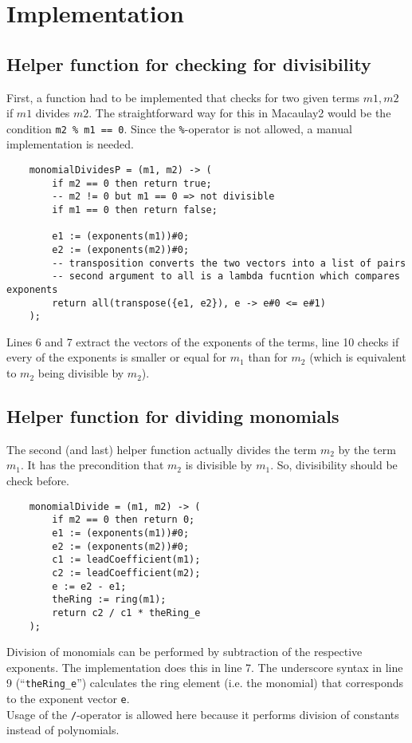 \documentclass[a4paper,article,math]{extarticle}
\begin{document}
\section{Implementation}
\subsection{Helper function for checking for divisibility}
First, a function had to be implemented that checks for two given terms $m1, m2$ if $m1$ divides $m2$.
The straightforward way for this in Macaulay2 would be the condition \texttt{m2 \% m1 == 0}.
Since the \texttt{\%}-operator is not allowed, a manual implementation is needed.
\begin{lstlisting}
	monomialDividesP = (m1, m2) -> (
		if m2 == 0 then return true;
		-- m2 != 0 but m1 == 0 => not divisible
		if m1 == 0 then return false;
		
		e1 := (exponents(m1))#0;
		e2 := (exponents(m2))#0;
		-- transposition converts the two vectors into a list of pairs
		-- second argument to all is a lambda fucntion which compares exponents
		return all(transpose({e1, e2}), e -> e#0 <= e#1)
	);
\end{lstlisting}
Lines 6 and 7 extract the vectors of the exponents of the terms, line 10 checks if every of the exponents is smaller or equal for $m_1$ than for $m_2$ (which is equivalent to $m_2$ being divisible by $m_2$).
\subsection{Helper function for dividing monomials}
The second (and last) helper function actually divides the term $m_2$ by the term $m_1$.
It has the precondition that $m_2$ is divisible by $m_1$.
So, divisibility should be check before.
\begin{lstlisting}
	monomialDivide = (m1, m2) -> (
		if m2 == 0 then return 0;
		e1 := (exponents(m1))#0;
		e2 := (exponents(m2))#0;
		c1 := leadCoefficient(m1);
		c2 := leadCoefficient(m2);
		e := e2 - e1;
		theRing := ring(m1);
		return c2 / c1 * theRing_e
	);
\end{lstlisting}
Division of monomials can be performed by subtraction of the respective exponents.
The implementation does this in line 7.
The underscore syntax in line 9 (“\texttt{theRing\_e}”) calculates the ring element (i.e. the monomial) that corresponds to the exponent vector \texttt{e}.\\
Usage of the \texttt{/}-operator is allowed here because it performs division of constants instead of polynomials.
\pagebreak
\end{document}
